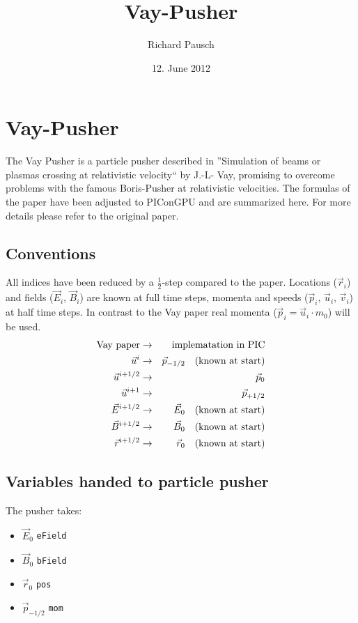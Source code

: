 \documentclass[a4paper,12pt]{article}
\title{Vay-Pusher}
\author{Richard Pausch}
\date{12. June 2012}
\begin{document}
\section{Vay-Pusher}

The Vay Pusher is a particle pusher described in ''Simulation of beams or plasmas crossing at relativistic velocity`` by J.-L- Vay, promising to overcome problems with the famous Boris-Pusher at relativistic velocities. The formulas of the paper have been adjusted to PIConGPU and are summarized here. For more details please refer to the original paper.


\subsection{Conventions}
All indices have been reduced by a $\frac{1}{2}$-step compared to the paper. 
Locations ($\vec r_i$) and fields ($\vec E_i$, $\vec B_i$) are known at full time steps, momenta and speeds ($\vec p_i$, $\vec u_i$, $\vec v_i$) at half time steps. In contrast to the Vay paper real momenta ($\vec p_i = \vec u_i \cdot m_0$) will be used.
\begin{eqnarray*}
\mbox{Vay paper} & \rightarrow & \mbox{implematation in PIC} \\
\vec u^{i} & \rightarrow & \vec p_{-1/2} \mbox{\quad  (known at start)}\\
\vec u^{i+1/2} & \rightarrow & \vec p_{0}\\
\vec u^{i+1} & \rightarrow & \vec p_{+1/2}\\
\vec E^{i+1/2} & \rightarrow & \vec E_{0}  \mbox{\quad  (known at start)}\\
\vec B^{i+1/2} & \rightarrow & \vec B_{0}  \mbox{\quad  (known at start)}\\
\vec r^{i+1/2} & \rightarrow & \vec r_{0}  \mbox{\quad  (known at start)}
\end{eqnarray*}

\subsection{Variables handed to particle pusher}
The pusher takes: 
\begin{itemize}
	\item $\vec E_0$ \quad \texttt{eField}
	\item $\vec B_0$ \quad \texttt{bField}
	\item $\vec r_0$ \qquad \texttt{pos}
	\item $\vec p_{-1/2}$ \quad \texttt{mom}
\end{itemize}
\end{document}
